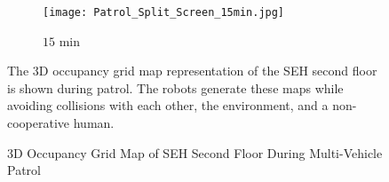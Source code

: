 \begin{figure}[!t]
{\begin{subfigure}[t]{0.25\columnwidth}
    	\end{subfigure}
	\hspace*{0.05\textwidth}
    	\begin{subfigure}[t]{0.25\columnwidth}
          	\texttt{[image: Patrol\_Split\_Screen\_15min.jpg]}
        		\caption{$15$ min}
    	\end{subfigure}
	}
	\caption{3D Occupancy Grid Map of SEH Second Floor During Multi-Vehicle Patrol}
	\medskip
	\small
	The 3D occupancy grid map representation of the SEH second floor is shown during patrol. The robots generate these maps while avoiding collisions with each other, the environment, and a non-cooperative human.
	\label{fig:Sim3DMapPatrol}
\end{figure}

	
\begin{figure}[!t]
\end{figure}
